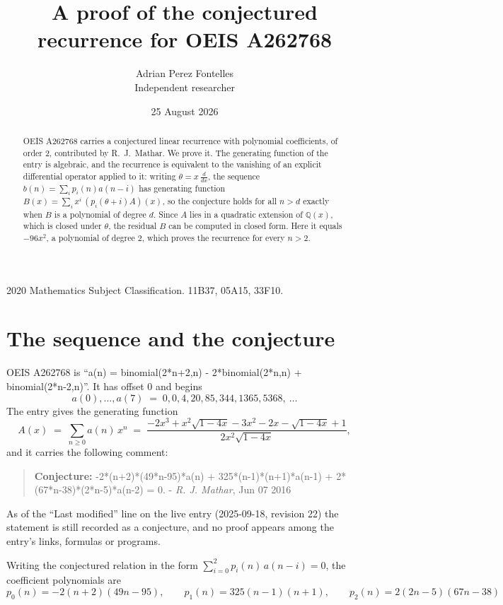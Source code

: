 \documentclass[11pt,a4paper]{article}
\title{A proof of the conjectured recurrence for OEIS A262768}
\author{Adrian Perez Fontelles\\ \small Independent researcher}
\date{25 August 2026}
\theoremstyle{plain}
\theoremstyle{definition}
\begin{document}
\maketitle

\begin{abstract}
OEIS A262768 carries a conjectured linear recurrence with polynomial coefficients, of
order 2, contributed by R.~J.~Mathar. We prove it. The generating function of the
entry is algebraic, and the recurrence is equivalent to the vanishing of an explicit
differential operator applied to it: writing $\theta=x\,\frac{d}{dx}$, the sequence
$b(n)=\sum_{i}p_{i}(n)a(n-i)$ has generating function
$B(x)=\sum_{i}x^{i}\,(p_{i}(\theta+i)A)(x)$, so the conjecture holds for all $n>d$ exactly
when $B$ is a polynomial of degree $d$. Since $A$ lies in a quadratic extension of
$\mathbb{Q}(x)$, which is closed under $\theta$, the residual $B$ can be computed in
closed form. Here it equals $- 96 x^{2}$, a polynomial of degree $2$, which proves
the recurrence for every $n>2$.
\end{abstract}

\noindent\small 2020 Mathematics Subject Classification. 11B37, 05A15, 33F10.\normalsize

\section{The sequence and the conjecture}

OEIS A262768 is ``a(n) = binomial(2*n+2,n) - 2*binomial(2*n,n) + binomial(2*n-2,n)''. It has offset $0$ and begins
\[
a(0),\dots,a(7)\;=\;0, 0, 4, 20, 85, 344, 1365, 5368,\ \dots
\]
The entry gives the generating function
\begin{equation}\label{eq:gf}
A(x)\;=\;\sum_{n\ge 0} a(n)\,x^{n}\;=\;\frac{- 2 x^{3} + x^{2} \sqrt{1 - 4 x} - 3 x^{2} - 2 x - \sqrt{1 - 4 x} + 1}{2 x^{2} \sqrt{1 - 4 x}} ,
\end{equation}
and it carries the following comment:
\begin{quote}\small
\textbf{Conjecture:} -2*(n+2)*(49*n-95)*a(n) + 325*(n-1)*(n+1)*a(n-1) + 2*(67*n-38)*(2*n-5)*a(n-2) = 0. - \emph{R. J. Mathar}, Jun 07 2016
\end{quote}
As of the ``Last modified'' line on the live entry (2025-09-18, revision 22) the
statement is still recorded as a conjecture, and no proof appears among the entry's links,
formulas or programs.

Writing the conjectured relation in the form $\sum_{i=0}^{2}p_{i}(n)\,a(n-i)=0$,
the coefficient polynomials are
\[
p_{0}(n)=- 2 \left(n + 2\right) \left(49 n - 95\right),\qquad p_{1}(n)=325 \left(n - 1\right) \left(n + 1\right),\qquad p_{2}(n)=2 \left(2 n - 5\right) \left(67 n - 38\right)
\]
\end{document}
